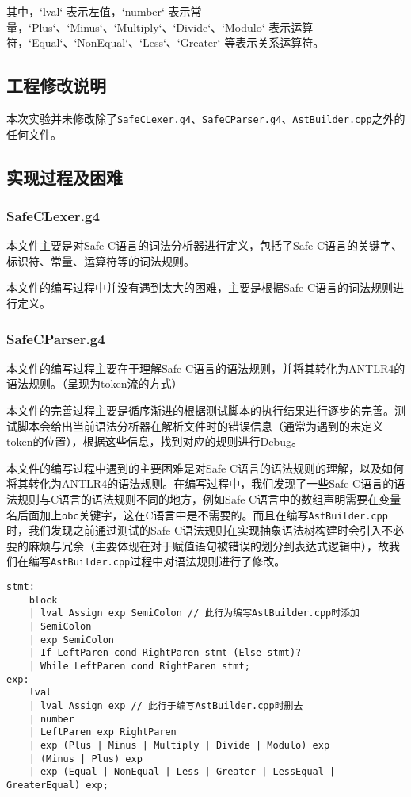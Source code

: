 \documentclass[../main.tex]{subfiles}
\begin{document}
其中，`lval` 表示左值，`number` 表示常量，`Plus`、`Minus`、`Multiply`、`Divide`、`Modulo` 表示运算符，`Equal`、`NonEqual`、`Less`、`Greater` 等表示关系运算符。



\songti
\subsection{工程修改说明}

本次实验并未修改除了\texttt{SafeCLexer.g4}、\texttt{SafeCParser.g4}、\texttt{AstBuilder.cpp}之外的任何文件。

\subsection{实现过程及困难}

\subsubsection{SafeCLexer.g4}

本文件主要是对Safe C语言的词法分析器进行定义，包括了Safe C语言的关键字、标识符、常量、运算符等的词法规则。

本文件的编写过程中并没有遇到太大的困难，主要是根据Safe C语言的词法规则进行定义。

\subsubsection{SafeCParser.g4}

本文件的编写过程主要在于理解Safe C语言的语法规则，并将其转化为ANTLR4的语法规则。（呈现为token流的方式）

本文件的完善过程主要是循序渐进的根据测试脚本的执行结果进行逐步的完善。测试脚本会给出当前语法分析器在解析文件时的错误信息（通常为遇到的未定义token的位置），根据这些信息，找到对应的规则进行Debug。


本文件的编写过程中遇到的主要困难是对Safe C语言的语法规则的理解，以及如何将其转化为ANTLR4的语法规则。在编写过程中，我们发现了一些Safe C语言的语法规则与C语言的语法规则不同的地方，例如Safe C语言中的数组声明需要在变量名后面加上\texttt{obc}关键字，这在C语言中是不需要的。而且在编写\texttt{AstBuilder.cpp}时，我们发现之前通过测试的Safe C语法规则在实现抽象语法树构建时会引入不必要的麻烦与冗余（主要体现在对于赋值语句被错误的划分到表达式逻辑中），故我们在编写\texttt{AstBuilder.cpp}过程中对语法规则进行了修改。

\begin{mdframed}
	\begin{verbatim}
stmt: 
    block
    | lval Assign exp SemiColon // 此行为编写AstBuilder.cpp时添加
    | SemiColon
    | exp SemiColon
    | If LeftParen cond RightParen stmt (Else stmt)?
    | While LeftParen cond RightParen stmt;
exp:
    lval
    | lval Assign exp // 此行于编写AstBuilder.cpp时删去
    | number
    | LeftParen exp RightParen
    | exp (Plus | Minus | Multiply | Divide | Modulo) exp
    | (Minus | Plus) exp
    | exp (Equal | NonEqual | Less | Greater | LessEqual | GreaterEqual) exp;
  \end{verbatim}
\end{mdframed}
\end{document}
